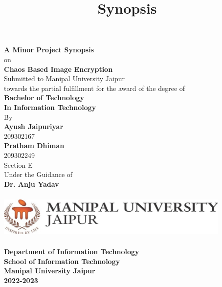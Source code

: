 \documentclass[11pt,a4paper,english]{article}
\begin{document}
\title{Synopsis}
\begin{titlepage}
    \begin{center}
        \LARGE
        \textbf{A Minor Project Synopsis}\\
        on\\
        \Huge
        \textbf{Chaos Based Image Encryption}\\
        \vspace{0.5cm}
        \Large
        Submitted to Manipal University Jaipur\\
        towards the partial fulfillment for the award of the degree of\\
        \vspace{0.5cm}
        \LARGE
        \textbf{Bachelor of Technology}\\
        \textbf{In Information Technology}\\
        \vspace{0.5cm}
        \large
        By\\
        \Large
        \textbf{Ayush Jaipuriyar}\\
        209302167\\
        \textbf{Pratham Dhiman}\\
        209302249\\
        Section E\\
        \vspace{0.5cm}
        \large
        Under the Guidance of\\
        \Large
        \textbf{Dr. Anju Yadav }

        \vfill

        \includegraphics[width=11.58cm,height=2.28cm]{logo}

        \LARGE
        \textbf{Department of Information Technology}\\
        \textbf{School of Information Technology }\\
        \textbf{Manipal University Jaipur}\\
        \Large
        \textbf{2022-2023}

    \end{center}
\end{titlepage}
\newpage
\date{}
\title{}
\maketitle
\tableofcontents
\newpage
\end{document}
